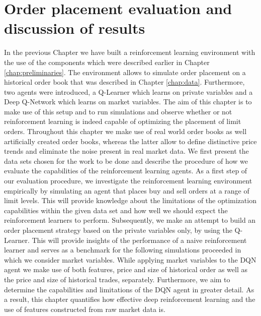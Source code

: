 \chapter{Order placement evaluation and discussion of results}
\label{chap:analysis}

In the previous Chapter we have built a reinforcement learning environment with the use of the components which were described earlier in Chapter \ref{chap:preliminaries}.
The environment allows to simulate order placement on a historical order book that was described in Chapter \ref{chap:data}.
Furthermore, two agents were introduced, a Q-Learner which learns on private variables and a Deep Q-Network which learns on market variables.
The aim of this chapter is to make use of this setup and to run simulations and observe whether or not reinforcement learning is indeed capable of optimizing the placement of limit orders.
Throughout this chapter we make use of real world order books as well artificially created order books, whereas the latter allow to define distinctive price trends and eliminate the noise present in real market data.
We first present the data sets chosen for the work to be done and describe the procedure of how we evaluate the capabilities of the reinforcement learning agents.
As a first step of our evaluation procedure, we investigate the reinforcement learning environment empirically by simulating an agent that places buy and sell orders at a range of limit levels.
This will provide knowledge about the limitations of the optimization capabilities within the given data set and how well we should expect the reinforcement learners to perform.
Subsequently, we make an attempt to build an order placement strategy based on the private variables only, by using the Q-Learner.
This will provide insights of the performance of a naive reinforcement learner and serves as a benchmark for the following simulations proceeded in which we consider market variables.
While applying market variables to the DQN agent we make use of both features, price and size of historical order as well as the price and size of historical trades, separately.
Furthermore, we aim to determine the capabilities and limitations of the DQN agent in greater detail.
As a result, this chapter quantifies how effective deep reinforcement learning and the use of features constructed from raw market data is.


